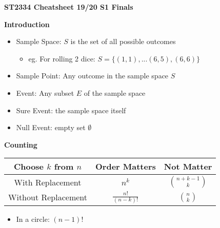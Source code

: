 \documentclass[a4paper, 12pt]{article}
\begin{document}
\setlength\parindent{0pt}
\scriptsize
{}

\begin{center}
{\normalsize\textbf{ST2334 Cheatsheet 19/20 S1 Finals}}
\end{center}
\begin{multicols*}{4}
\noindent
{\small\textbf{Introduction}}
\begin{itemize}
    \item Sample Space: $S$ is the set of all possible outcomes
    \begin{itemize}
        \item eg. For rolling 2 dice: $S = \{(1,1),...(6,5),(6,6)\}$
    \end{itemize}
    \item Sample Point: Any outcome in the sample space $S$
    \item Event: Any subset $E$ of the sample space
    \item Sure Event: the sample space itself
    \item Null Event: empty set $\emptyset$
\end{itemize}
\textbf{Counting} \\
\tiny
\begin{tabular}{ |c|c c| }
    \hline
    Choose $k$ from $n$ & Order Matters & Not Matter \\ 
    \hline
    With Replacement & $n^k$ & $\binom{n + k - 1}{k}$\\ 
    Without Replacement & $\frac{n!}{(n - k)!}$ & $\binom{n}{k}$ \\ 
    \hline
\end{tabular}
\scriptsize
\begin{itemize}
    \item In a circle: $(n - 1)!$ 
\end{itemize}
\medskip


\end{multicols*}
\end{document}
